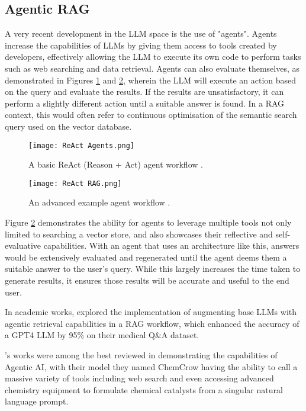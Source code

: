 \subsection{Agentic RAG}
A very recent development in the LLM space is the use of "agents". Agents increase the capabilities of LLMs by giving them 
access to tools created by developers, effectively allowing the LLM to execute its own code to perform tasks such as web searching 
and data retrieval. Agents can also evaluate themselves, as demonstrated in Figures \ref{fig:ReActAgents} and \ref{fig:ReActRAG}, 
wherein the LLM will execute an action based on the query and evaluate the results. If the results are unsatisfactory, it can perform a slightly 
different action until a suitable answer is found. In a RAG context, this would often refer to continuous optimisation of the semantic search query 
used on the vector database.

\begin{figure}[H] 
    \centering
    \texttt{[image: ReAct Agents.png]}
    \caption{A basic ReAct (Reason + Act) agent workflow \autocite{weaviateWhatAgenticRAG2024}.}
    \label{fig:ReActAgents}
\end{figure}

\begin{figure}[H] 
    \centering
    \texttt{[image: ReAct RAG.png]}
    \caption{An advanced example agent workflow \autocite{weaviateWhatAgenticRAG2024}.}
    \label{fig:ReActRAG}
\end{figure}

Figure \ref{fig:ReActRAG} demonstrates the ability for agents to leverage multiple tools not only limited to searching a vector store,
and also showcases their reflective and self-evaluative capabilities. With an agent that uses an architecture like this, answers would be 
extensively evaluated and regenerated until the agent deems them a suitable answer to the user's query. While this largely increases the 
time taken to generate results, it ensures those results will be accurate and useful to the end user. 

In academic works, \textcite{wooCustomLargeLanguage2025} explored the implementation of augmenting base LLMs with agentic retrieval 
capabilities in a RAG workflow, which enhanced the accuracy of a GPT4 LLM by 95\% on their medical Q\&A dataset.

\textcite{m.branAugmentingLargeLanguage2024}'s works were among the best reviewed in demonstrating the capabilities of 
Agentic AI, with their model they named ChemCrow having the ability to call a massive variety of tools including web search 
and even accessing advanced chemistry equipment to formulate chemical catalysts from a singular natural language prompt.

